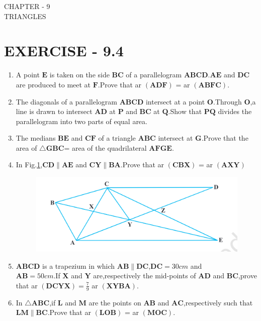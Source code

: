 \documentclass[12pt]{article}
\let\vec\mathbf
\begin{document}
\begin{center}
\textbf\large{CHAPTER - 9  \\  TRIANGLES}
\section*{EXERCISE - 9.4}
\end{center}

\begin{enumerate}

\item A point $\vec{E} $ is taken on the side $\vec{BC} $ of a parallelogram $\vec{ABCD} $.$\vec{AE}$ and  $\vec{DC}$ are produced to meet at $\vec{F}$.Prove that  ar $\vec{(ADF)}$ = ar $\vec{(ABFC)}$.
\item The diagonals of a parallelogram $\vec{ABCD}$ intersect at a point $\vec{O}$.Through $\vec{O}$,a line is drawn to intersect $\vec{AD}$ at $\vec{P}$ and $\vec{BC}$ at $\vec{Q}$.Show that $\vec{PQ}$ divides the parallelogram into two parts of equal area.
\item The medians $\vec{BE}$ and $\vec{CF}$ of a triangle $\vec{ABC}$ intersect at $\vec{G}$.Prove that the area of $ \triangle\vec{GBC} $= area of the quadrilateral $\vec{AFGE}$.	
\item In Fig.\ref{fig:9.24},$\vec{CD} \parallel \vec{AE} $ and $ \vec{CY} \parallel \vec{BA} $.Prove that ar $\vec{(CBX)}$ = ar $\vec{(AXY)}$
\begin{figure}[h]
	\centering
	\includegraphics[width=\columnwidth]{Figs/Fig9.24.png}
	\caption{}
	\label{fig:9.24}
\end{figure}
\item $\vec{ABCD}$ is a trapezium in which $\vec{AB} \parallel \vec{DC} $,$\vec{DC} = 30 cm $  and \\ $\vec{AB} = 50 cm $.If $\vec{X}$ and $\vec{Y}$ are,respectively the mid-points of $\vec{AD}$ and $\vec{BC}$,prove that  ar $\vec{(DCYX)} = \frac{7}{9}$ ar $\vec{(XYBA)} $.
\item  In $ \triangle\vec{ABC} $,if $\vec{L}$ and $\vec{M}$ are the points on $\vec{AB}$ and $\vec{AC}$,respectively such that $ \vec{LM} \parallel \vec{BC} $.Prove that ar $\vec{(LOB)}$ = ar $\vec{(MOC)}$.

\end{enumerate}
\end{document}
